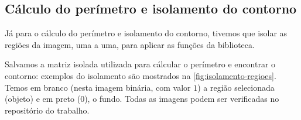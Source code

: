 \documentclass[brazilian,a4paper,twocolumn]{article}
\begin{document}
    \subsection{Cálculo do perímetro e isolamento do contorno}
    \label{sec:resultados-medicao}

        Já para o cálculo do perímetro e isolamento do contorno, tivemos que isolar as regiões da imagem, uma a uma, para aplicar as funções da biblioteca.

        Salvamos a matriz isolada utilizada para cálcular o perímetro e encontrar o contorno: exemplos do isolamento são mostrados na \cref{fig:isolamento-regioes}. Temos em branco (nesta imagem binária, com valor $1$) a região selecionada (objeto) e em preto ($0$), o fundo. Todas as imagens podem ser verificadas no repositório do trabalho.
\end{document}
